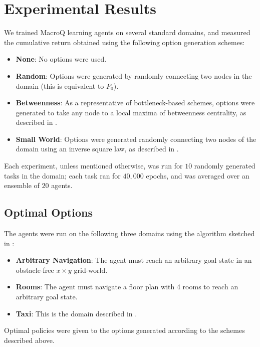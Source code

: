 \section{Experimental Results}
\label{sec:experiments}

We trained MacroQ learning agents on several standard domains, and
measured the cumulative return obtained using the following option
generation schemes: 
\begin{itemize}
   \item \textbf{None}: No options were used.
   \item \textbf{Random}: Options were generated by randomly connecting
     two nodes in the domain (this is equivalent to $P_0$).
   \item \textbf{Betweenness}: As a representative of bottleneck-based
     schemes, options were generated to take any node to a local maxima
     of betweenness centrality, as described in \cite{Simsek2008}. 
   \item \textbf{Small World}: Options were generated randomly
     connecting two nodes of the domain using an inverse square law, as
     described in .
\end{itemize}

Each experiment, unless mentioned otherwise, was run for $10$ randomly
generated tasks in the domain; each task ran for $40,000$ epochs, and
was averaged over an ensemble of $20$ agents.

\subsection{Optimal Options}
The agents were run on the following three domains using the algorithm
sketched in :
\begin{itemize}
   \item \textbf{Arbitrary Navigation}: The agent must reach an
     arbitrary goal state in an obstacle-free $x \times y$ grid-world. 
   \item \textbf{Rooms}: The agent must navigate a floor plan with
     4 rooms to reach an arbitrary goal state.
   \item \textbf{Taxi}: This is the domain described in
     .
\end{itemize}

Optimal policies were given to the options generated according to the
schemes described above. 

